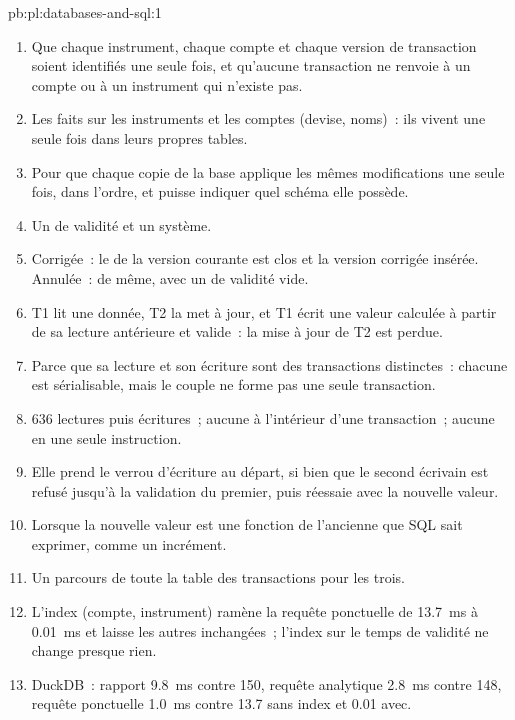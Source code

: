 \begin{solution}{pb:pl:databases-and-sql:1}
\begin{enumerate}
\item Que chaque instrument, chaque compte et chaque version de transaction soient identifiés une seule fois, et qu'aucune transaction ne renvoie
à un compte ou à un instrument qui n'existe pas.
\item Les faits sur les instruments et les comptes (devise, noms)~: ils vivent une seule fois dans leurs propres tables.
\item Pour que chaque copie de la base applique les mêmes modifications une seule fois, dans l'ordre, et puisse indiquer quel schéma elle possède.
\item Un  de validité et un  système.
\item Corrigée~: le  de la version courante est clos et la version corrigée insérée. Annulée~: de même, avec un  de validité
vide.
\item T1 lit une donnée, T2 la met à jour, et T1 écrit une valeur calculée à partir de sa lecture antérieure et valide~: la mise à jour de T2 est perdue.
\item Parce que sa lecture et son écriture sont des transactions distinctes~: chacune est sérialisable, mais le couple ne forme pas une seule transaction.
\item 636 lectures puis écritures~; aucune à l'intérieur d'une transaction~; aucune en une seule instruction.
\item Elle prend le verrou d'écriture au départ, si bien que le second écrivain est refusé jusqu'à la validation du premier, puis réessaie avec la nouvelle valeur.
\item Lorsque la nouvelle valeur est une fonction de l'ancienne que SQL sait exprimer, comme un incrément.
\item Un parcours de toute la table des transactions pour les trois.
\item L'index (compte, instrument) ramène la requête ponctuelle de 13.7~ms à 0.01~ms et laisse les autres inchangées~; l'index sur le temps de validité
ne change presque rien.
\item DuckDB~: rapport 9.8~ms contre 150, requête analytique 2.8~ms contre 148, requête ponctuelle 1.0~ms contre 13.7 sans index et 0.01 avec.

\end{enumerate}
\end{solution}
